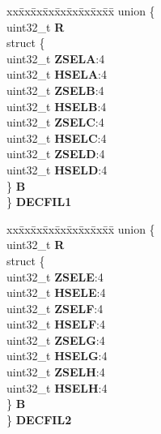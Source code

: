 \begin{DoxyCompactItemize}
\begin{tabbing}
\end{tabbing}\item 
\mbox{\label{structSIU__tag_a06ee95e17377e6cc2532ac8575e88309}} 
\begin{tabbing}
xx\=xx\=xx\=xx\=xx\=xx\=xx\=xx\=xx\=\kill
union \{\\
\>uint32\_t {\bfseries R}\\
\>struct \{\\
\>\>uint32\_t {\bfseries ZSELA}:4\\
\>\>uint32\_t {\bfseries HSELA}:4\\
\>\>uint32\_t {\bfseries ZSELB}:4\\
\>\>uint32\_t {\bfseries HSELB}:4\\
\>\>uint32\_t {\bfseries ZSELC}:4\\
\>\>uint32\_t {\bfseries HSELC}:4\\
\>\>uint32\_t {\bfseries ZSELD}:4\\
\>\>uint32\_t {\bfseries HSELD}:4\\
\>\} {\bfseries B}\\
\} {\bfseries DECFIL1}\\

\end{tabbing}\item 
\mbox{\label{structSIU__tag_a44b84aaedf0f6118414a545715ee94d1}} 
\begin{tabbing}
xx\=xx\=xx\=xx\=xx\=xx\=xx\=xx\=xx\=\kill
union \{\\
\>uint32\_t {\bfseries R}\\
\>struct \{\\
\>\>uint32\_t {\bfseries ZSELE}:4\\
\>\>uint32\_t {\bfseries HSELE}:4\\
\>\>uint32\_t {\bfseries ZSELF}:4\\
\>\>uint32\_t {\bfseries HSELF}:4\\
\>\>uint32\_t {\bfseries ZSELG}:4\\
\>\>uint32\_t {\bfseries HSELG}:4\\
\>\>uint32\_t {\bfseries ZSELH}:4\\
\>\>uint32\_t {\bfseries HSELH}:4\\
\>\} {\bfseries B}\\
\} {\bfseries DECFIL2}\\


\end{tabbing}
\end{DoxyCompactItemize}

